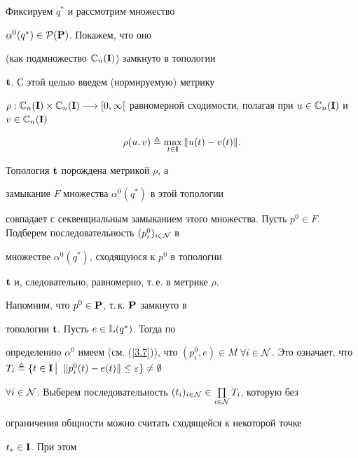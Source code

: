 \begin{pf}


Фиксируем $q^*$ и рассмотрим множество


${{\alpha}^0}(q^*) \in \cal{P}(\bold{P})$. Покажем, что оно


(как подмножество ${\Bbb{C}_n}(\bold{I})$) замкнуто в топологии


$\bold{t}$. С этой целью введем (нормируемую) метрику


$\rho:{\Bbb{C}_n}(\bold{I}) \times {\Bbb{C}_n}( \bold{I})


\lo [0,\infty[$ равномерной сходимости, полагая при $u \in


{\Bbb{C}_n}(\bold{I})$ и $v \in {\Bbb{C}_n}(\bold{I})$


$$


{\rho}(u,v) \triangleq \max\limits_{t \in \bold{I}} \|{u(t)} -


{v(t)}\|.


$$


Топология $\bold{t}$ порождена метрикой $\rho$, а


замыкание $F$ множества ${{\alpha}^0}(q^*)$ в этой топологии


совпадает с секвенциальным замыканием этого множества. Пусть ${p^0}


\in F$. Подберем последовательность $(p_i^0)_{i \in \cal{N}}$ в


множестве ${{\alpha}^0}(q^*)$, сходящуюся к $p^0$ в топологии


$\bold{t}$ и, следовательно, равномерно, т.\,е. в метрике $\rho$.


Напомним, что ${p^0} \in \bold{P}$, т.\,к. $\bold{P}$ замкнуто в


топологии $\bold{t}$. Пусть $e \in \Bbb{L}(q^*)$. Тогда по


определению ${\alpha}^0$ имеем (см. (\ref{3.7})), что $(p_i^0,e) \in


M$ \; $\fo{i} \in \cal{N}$. Это означает, что ${T_i} \triangleq \{t


\in \bold{I}\,\big|\,$ $\|{p_i^0}(t) - {e(t)} \| \le \var\} \ne \emp$




\; $\fo{i} \in \cal{N}$. Выберем последовательность $(t_i)_{i \in


\cal{N}} \in \prod\limits_{i \in \cal{N}}{T_i}$, которую без


ограничения общности можно считать сходящейся к некоторой точке


${t_*} \in \bold{I}$. При этом



\end{pf}
